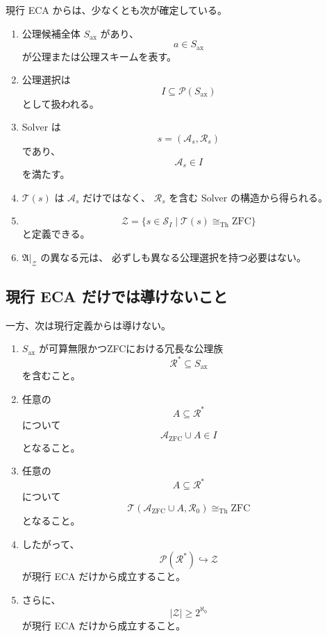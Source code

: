 \documentclass[a4paper,11pt]{article}
\newcommand{\Solver}{\mathcal{S}}
\newcommand{\Ax}{S_{\mathrm{ax}}}
\newcommand{\Sel}{I}
\begin{document}
現行 ECA からは、少なくとも次が確定している。

\begin{enumerate}
\item
公理候補全体 $\Ax$ があり、
\[
a\in\Ax
\]
が公理または公理スキームを表す。

\item
公理選択は
\[
\Sel\subseteq\mathcal{P}(\Ax)
\]
として扱われる。

\item
Solver は
\[
s=(\mathcal{A}_s,\mathcal{R}_s)
\]
であり、
\[
\mathcal{A}_s\in\Sel
\]
を満たす。

\item
$\mathcal{T}(s)$ は $\mathcal{A}_s$ だけではなく、
$\mathcal{R}_s$ を含む Solver の構造から得られる。

\item
\[
\mathcal{Z}
=
\{s\in\Solver_{\Sel}\mid
\mathcal{T}(s)\cong_{\mathrm{Th}}\mathrm{ZFC}\}
\]
と定義できる。

\item
$\mathfrak{A}|_{\mathcal{Z}}$ の異なる元は、
必ずしも異なる公理選択を持つ必要はない。
\end{enumerate}

\subsection{現行 ECA だけでは導けないこと}

一方、次は現行定義からは導けない。

\begin{enumerate}
\item
$\Ax$ が可算無限かつZFCにおける冗長な公理族
\[
\mathcal{R}^{*}\subseteq\Ax
\]
を含むこと。

\item
任意の
\[
A\subseteq\mathcal{R}^{*}
\]
について
\[
\mathcal{A}_{\mathrm{ZFC}}\cup A\in\Sel
\]
となること。

\item
任意の
\[
A\subseteq\mathcal{R}^{*}
\]
について
\[
\mathcal{T}
\left(
\mathcal{A}_{\mathrm{ZFC}}\cup A,\mathcal{R}_0
\right)
\cong_{\mathrm{Th}}\mathrm{ZFC}
\]
となること。

\item
したがって、
\[
\mathcal{P}(\mathcal{R}^{*})\hookrightarrow\mathcal{Z}
\]
が現行 ECA だけから成立すること。

\item
さらに、
\[
|\mathcal{Z}|\ge2^{\aleph_0}
\]
が現行 ECA だけから成立すること。
\end{enumerate}
\end{document}
